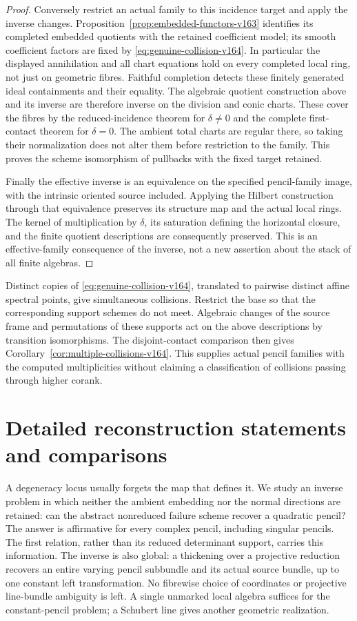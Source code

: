 \documentclass[11pt,reqno]{amsart}
\numberwithin{equation}{section}
\theoremstyle{definition}\newtheorem{definition}[theorem]{Definition}
\theoremstyle{remark}\newtheorem{remark}[theorem]{Remark}
\begin{document}
\begin{proof}
Conversely restrict an actual family to this incidence target and
apply the inverse changes. Proposition~\ref{prop:embedded-functors-v163}
identifies its completed embedded quotients with the retained
coefficient model; its smooth coefficient factors are fixed by
\eqref{eq:genuine-collision-v164}. In particular the displayed
annihilation and all chart equations hold on every completed local
ring, not just on geometric fibres. Faithful completion detects
these finitely generated ideal containments and their equality.
The algebraic quotient construction above and its inverse are
therefore inverse on the division and conic charts. These cover
the fibres by the reduced-incidence theorem for $\delta\ne0$ and
the complete first-contact theorem for $\delta=0$. The ambient
total charts are regular there, so taking their normalization does
not alter them before restriction to the family. This proves the
scheme isomorphism of pullbacks with the fixed target retained.

Finally the effective inverse is an equivalence on the specified
pencil-family image, with the intrinsic oriented source included.
Applying the Hilbert construction through that equivalence preserves
its structure map and the actual local rings. The kernel of
multiplication by $\delta$, its saturation defining the horizontal
closure, and the finite quotient descriptions are consequently
preserved. This is an effective-family consequence of the inverse,
not a new assertion about the stack of all finite algebras.
\end{proof}

Distinct copies of \eqref{eq:genuine-collision-v164}, translated to
pairwise distinct affine spectral points, give simultaneous
collisions. Restrict the base so that the corresponding support
schemes do not meet. Algebraic changes of the source frame and
permutations of these supports act on the above descriptions by
transition isomorphisms. The disjoint-contact comparison then gives
Corollary~\ref{cor:multiple-collisions-v164}. This supplies actual
pencil families with the computed multiplicities without claiming a
classification of collisions passing through higher corank.


\section{Detailed reconstruction statements and comparisons}
\label{sec:introduction-v132}

A degeneracy locus usually forgets the map that defines it.  We study
an inverse problem in which neither the ambient embedding nor the
normal directions are retained: can the abstract nonreduced failure
scheme recover a quadratic pencil?  The answer is affirmative for
every complex pencil, including singular pencils.  The first relation, rather than its reduced determinant support,
carries this information.  The inverse is also global: a thickening over a projective reduction
recovers an entire varying pencil subbundle and its actual source
bundle, up to one constant left transformation.  No fibrewise choice
of coordinates or projective line-bundle ambiguity is left.  A
single unmarked local algebra suffices for the constant-pencil
problem; a Schubert line gives another geometric realization.
\end{document}
